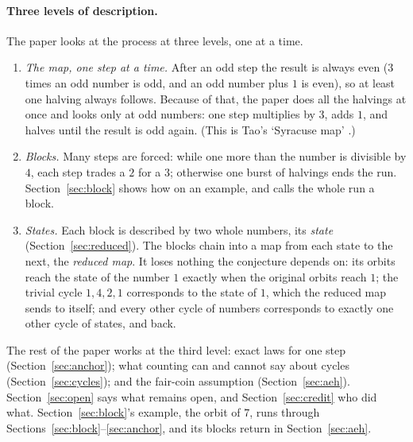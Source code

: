 \documentclass[11pt]{article}
\theoremstyle{remark}
\begin{document}
\paragraph{Three levels of description.} The paper looks at the process at three levels, one at a time.
\begin{enumerate}
\item[(1)] \emph{The map, one step at a time.} After an odd step the result is always even ($3$ times an odd number is odd, and an odd number plus $1$ is even), so at least one halving always follows. Because of that, the paper does all the halvings at once and looks only at odd numbers: one step multiplies by $3$, adds $1$, and halves until the result is odd again. (This is Tao's `Syracuse map' \cite{tao}.)
\item[(2)] \emph{Blocks.} Many steps are forced: while one more than the number is divisible by $4$, each step trades a $2$ for a $3$; otherwise one burst of halvings ends the run. Section~\ref{sec:block} shows how on an example, and calls the whole run a block.
\item[(3)] \emph{States.} Each block is described by two whole numbers, its \emph{state} (Section~\ref{sec:reduced}). The blocks chain into a map from each state to the next, the \emph{reduced map}. It loses nothing the conjecture depends on: its orbits reach the state of the number $1$ exactly when the original orbits reach $1$; the trivial cycle $1, 4, 2, 1$ corresponds to the state of $1$, which the reduced map sends to itself; and every other cycle of numbers corresponds to exactly one other cycle of states, and back.
\end{enumerate}
The rest of the paper works at the third level: exact laws for one step (Section~\ref{sec:anchor}); what counting can and cannot say about cycles (Section~\ref{sec:cycles}); and the fair-coin assumption (Section~\ref{sec:aeh}). Section~\ref{sec:open} says what remains open, and Section~\ref{sec:credit} who did what. Section~\ref{sec:block}'s example, the orbit of $7$, runs through Sections~\ref{sec:block}--\ref{sec:anchor}, and its blocks return in Section~\ref{sec:aeh}.
\end{document}
